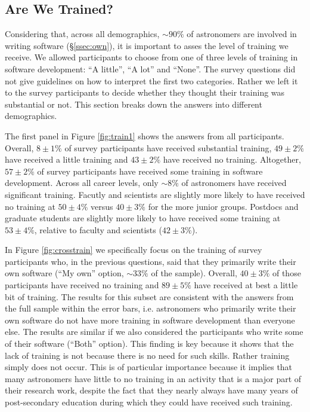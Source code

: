 \subsection{Are We Trained?}

Considering that, across all demographics, $\sim90\%$ of astronomers are involved in writing software (\S \ref{ssec:own}), it is important to asses the level of training we receive. We allowed participants to choose from one of three levels of training in software development: ``A little'', ``A lot'' and ``None''. The survey questions did not give guidelines on how to interpret the first two categories. Rather we left it to the survey participants to decide whether they thought their training was substantial or not. This section breaks down the answers into different demographics. 

The first panel in Figure \ref{fig:train1} shows the answers from all participants. Overall, $8\pm1\%$ of survey participants have received substantial training, $49\pm2\%$ have received a little training and $43\pm2\%$ have received no training. Altogether, $57\pm2\%$ of survey participants have received some training in software development. Across all career levels, only $\sim8\%$ of astronomers have received significant training. Facutly and scientists are slightly more likely to have received no training at $50\pm4\%$ versus $40\pm3\%$ for the more junior groups. Postdocs and graduate students are slightly more likely to have received some training at $53\pm4\%$, relative to faculty and scientists ($42\pm3\%$).

In Figure \ref{fig:crosstrain} we specifically focus on the training of survey participants who, in the previous questions, said that they primarily write their own software (``My own'' option, $\sim33\%$ of the sample).  Overall, $40\pm3\%$ of those participants have received no training and $89\pm5\%$ have received at best a little bit of training. The results for this subset are consistent with the answers from the full sample within the error bars, i.e. astronomers who primarily write their own software do not have more training in software development than everyone else. The results are similar if we also considered the participants who write some of their software (``Both'' option). This finding is key because it shows that the lack of training is not because there is no need for such skills. Rather training simply does not occur. This is of particular importance because it implies that many astronomers have little to no training in an activity that is a major part of their research work, despite the fact that they nearly always have many years of post-secondary education during which they could have received such training.

